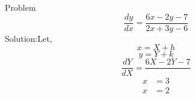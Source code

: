 \documentclass[12pt]{article}
\begin{document}
Problem\[\frac{dy}{dx}=\frac{6x-2y-7}{2x+3y-6}\]
Solution:Let,\[x=X+h\]\[y=Y+k\]
\[\frac{dY}{dX}=\frac{6X-2Y-7}{} \]
    \begin{align*}
        x&=3\\
        x&=2
    \end{align*}
\end{document}
